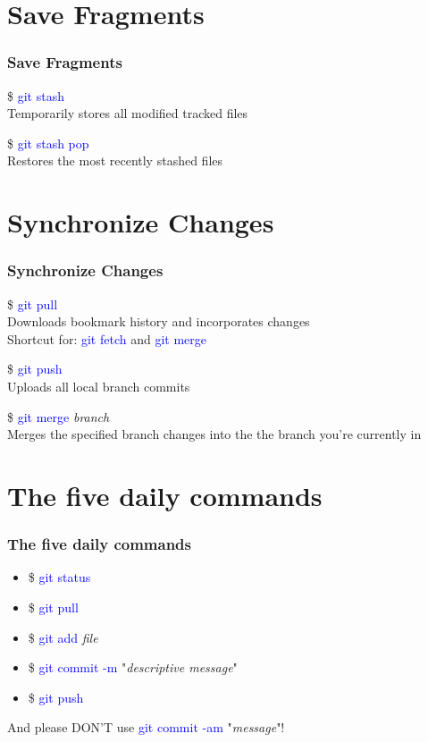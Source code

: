 \documentclass[aspectratio=169]{beamer}
\begin{document}
\section{Save Fragments}
\begin{frame}

\frametitle{Save Fragments}

\$ \textcolor{blue}{git stash}\\
Temporarily stores all modified tracked files

\pause

\$ \textcolor{blue}{git stash pop}\\
Restores the most recently stashed files

\end{frame}

\section{Synchronize Changes}
\begin{frame}

\frametitle{Synchronize Changes}

\$ \textcolor{blue}{git pull}\\
Downloads bookmark history and incorporates changes\\
Shortcut for: \textcolor{blue}{git fetch} and \textcolor{blue}{git merge}

\pause

\$ \textcolor{blue}{git push}\\
Uploads all local branch commits

\pause

\$ \textcolor{blue}{git merge} \textit{branch}\\
Merges the specified branch changes into the the branch you're currently in

\end{frame}

\section{The five daily commands}
\begin{frame}

\frametitle{The five daily commands}

\begin{itemize}
\item \$ \textcolor{blue}{git status}\\
\item \$ \textcolor{blue}{git pull}\\
\item \$ \textcolor{blue}{git add} \textit{file}\\
\item \$ \textcolor{blue}{git commit -m} "\textit{descriptive message}"\\
\item \$ \textcolor{blue}{git push}\\
\end{itemize}

And please DON'T use \textcolor{blue}{git commit -am} "\textit{message}"!

\end{frame}
\end{document}
